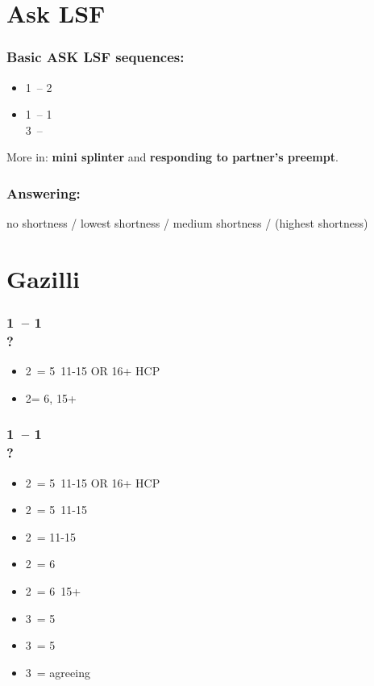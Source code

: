 \section{\texorpdfstring{Ask LSF}{askLSF}}\label{sec:askLSF}

\subsubsection*{Basic ASK LSF sequences:}
\begin{itemize}
    \item 1\major\ -- 2\major\ \\ 
    \item 1\minor\ -- 1\major \\ 3\major\ -- 
\end{itemize}

More in: \textbf{mini splinter} and \textbf{responding to partner's preempt}.

\subsubsection*{Answering:}

no shortness / lowest shortness / medium shortness / (highest shortness)

\section{\texorpdfstring{Gazilli}{gazilli}}\label{sec:gazilli}

\subsubsection*{1\hearts\ -- 1\spades\ \\ ?}
\begin{itemize}
    \item 2\clubs\ = 5\clubs\ 11-15 OR 16+ HCP \fonce
    \item 2\nt = 6\minor, 15+
\end{itemize}

\subsubsection*{1\hearts\ -- 1\ntx\ \\ ?}
\begin{itemize}
    \item 2\clubs\ = 5\hearts\clubs\ 11-15 OR 16+ HCP \fonce
    \item 2\diams\ = 5\diams\ 11-15
    \item 2\hearts\ = 11-15
    \item 2\spades\ = 6\spades\ \gf
    \item 2\ntx\ = 6\minor\ 15+
    \item 3\clubs\ = 5\clubs\ \gf
    \item 3\diams\ = 5\diams\ \gf
    \item 3\hearts\ = agreeing \hearts\ \gf
\end{itemize}

